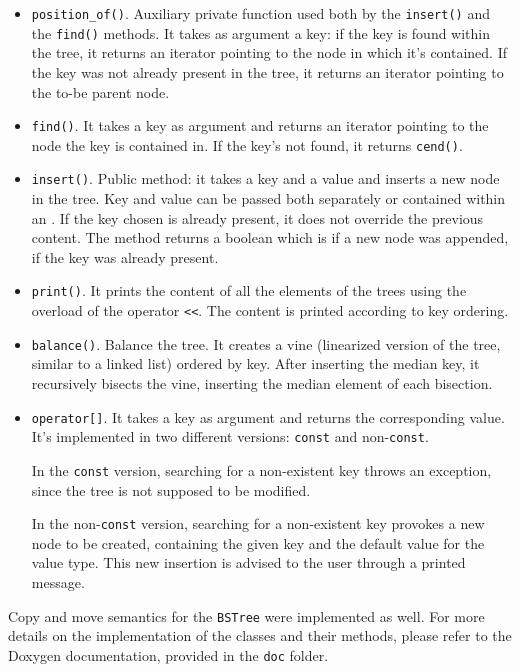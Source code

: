 \documentclass[12pt,a4paper,openany]{scrartcl}
\begin{document}
	\begin{itemize}
		\item \texttt{position\_of()}. Auxiliary private function used both by the \texttt{insert()} and the \texttt{find()} methods. It takes as argument a key: if the key is found within the tree, it returns an iterator pointing to the node in which it's contained. If the key was not already present in the tree, it returns an iterator pointing to the to-be parent node.
		\item \texttt{find()}. It takes a key as argument and returns an iterator pointing to the node the key is contained in. If the key's not found, it returns \texttt{cend()}.
		\item \texttt{insert()}. Public method: it takes a key and a value and inserts a new node in the tree. Key and value can be passed both separately or contained within an . If the key chosen is already present, it does not override the previous content. The method returns a boolean which is  if a new node was appended,  if the key was already present.
		\item \texttt{print()}. It prints the content of all the elements of the trees using the overload of the operator \texttt{<<}. The content is printed according to key ordering.
		\item \texttt{balance()}. Balance the tree. It creates a vine (linearized version of the tree, similar to a linked list) ordered by key. After inserting the median key, it recursively bisects the vine, inserting the median element of each bisection.
		\item \texttt{operator[]}. It takes a key as argument and returns the corresponding value. It's implemented in two different versions: \texttt{const} and non-\texttt{const}.
		
		In the \texttt{const} version, searching for a non-existent key throws an exception, since the tree is not supposed to be modified.
		
		In the non-\texttt{const} version, searching for a non-existent key provokes a new node to be created, containing the given key and the default value for the value type. This new insertion is advised to the user through a printed message.
	\end{itemize}
	
	
	\noindent Copy and move semantics for the \texttt{BSTree} were implemented as well. For more details on the implementation of the classes and their methods, please refer to the Doxygen documentation, provided in the \texttt{doc} folder.
	
\end{document}
